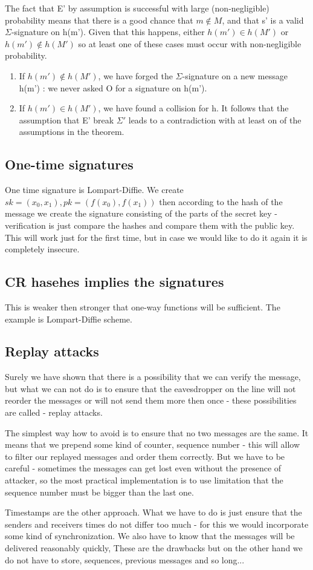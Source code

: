 \documentclass[a4paper,10pt]{article}
\begin{document}
The fact that E' by assumption is successful with large (non-negligible)
probability means that there is a good chance that $m \notin  M$, and that s' is a valid $\Sigma$-signature on h(m'). Given that this happens, either $h(m') \in h(M')$
or $h(m') \notin h(M')$ so at least one of these cases must occur with non-negligible
probability.
\begin{enumerate}
\item If $h(m') \notin h(M')$, we have forged the $\Sigma$-signature on a new message h(m') : we never asked O for a signature on h(m').
\item If $h(m') \in h(M')$, we have found a collision for h.
It follows that the assumption that E' break $\Sigma'$ leads to a contradiction with at least on of the assumptions in the theorem.
\end{enumerate}

\subsection*{One-time signatures}
One time signature is Lompart-Diffie. We create
$
sk = (x_0,x_1), pk = (f(x_0),f(x_1))
$ then according to the hash of the message we create the signature consisting of the parts of the secret key - verification is just compare the hashes and compare them with the public key. This will work just for the first time, but in case we would like to do it again it is completely insecure. 

\subsection*{CR hasehes implies the signatures}
This is weaker then stronger that one-way functions will be sufficient.  The example is Lompart-Diffie scheme.


\subsection*{Replay attacks}
Surely we have shown that there is a possibility that we can verify the message, but what we can not do is to ensure that the eavesdropper on the line will not reorder the messages or will not send them more then once - these possibilities are called - replay attacks. 

The simplest way how to avoid is to ensure that no two messages are the same. It means that we prepend some kind of counter, sequence number - this will allow to filter our replayed messages and order them correctly. But we have to be careful - sometimes the messages can get lost even without the presence of attacker, so the most practical implementation is to use limitation that the sequence number must be bigger than the last one.

Timestamps are the other approach. What we have to do is just ensure that the senders and receivers times do not differ too much - for this we would incorporate some kind of synchronization. We also have to know that the messages will be delivered reasonably quickly, These are the drawbacks but on the other hand we do not have to store, sequences, previous messages and so long...	
\end{document}
